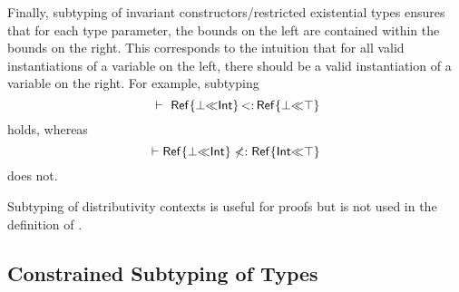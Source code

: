 Finally, subtyping of invariant constructors/restricted existential types
ensures that for each type parameter, the bounds on the left are contained
within the bounds on the right. This corresponds to the intuition that
for all valid instantiations of a variable on the left, there should be
a valid instantiation of a variable on the right.
For example, subtyping
\[
    \ \vdash\ \mathsf{Ref}\{\bot{\operatorname{\ll}}\mathsf{Int}\} \operatorname{<:} \mathsf{Ref}\{\bot{\operatorname{\ll}}\top\}
\]
holds, whereas
\[
    \vdash \mathsf{Ref}\{\bot{\operatorname{\ll}}\mathsf{Int}\} \nless:
    \mathsf{Ref}\{\mathsf{Int}{\operatorname{\ll}}\top\}
\]
does not.

Subtyping of distributivity contexts  is 
useful for proofs but is not used in the definition of .

\subsection{Constrained Subtyping of Types}%
\label{subsec:dec-sub:subtyctr}


